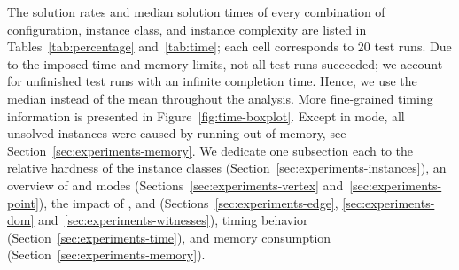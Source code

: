 The solution rates and median solution times of every combination of configuration, instance class, and instance complexity are listed in Tables~\ref{tab:percentage} and~\ref{tab:time}; each cell corresponds to 20 test runs.
Due to the imposed time and memory limits, not all test runs succeeded;
we account for unfinished test runs with an infinite completion time.
Hence, we use the median instead of the mean throughout the analysis.
More fine-grained timing information is presented in Figure~\ref{fig:time-boxplot}.
Except in \pnoedge mode, all unsolved instances were caused by running out of memory, see Section~\ref{sec:experiments-memory}.
We dedicate one subsection each to the relative hardness of the instance classes (Section~\ref{sec:experiments-instances}), an overview of \vertexguardmode and \pointguardmode modes (Sections~\ref{sec:experiments-vertex} and~\ref{sec:experiments-point}), the impact of \pointguardfilter, \domfilter and \witnessfilter (Sections~\ref{sec:experiments-edge}, \ref{sec:experiments-dom} and~\ref{sec:experiments-witnesses}), timing behavior (Section~\ref{sec:experiments-time}), and memory consumption (Section~\ref{sec:experiments-memory}).

